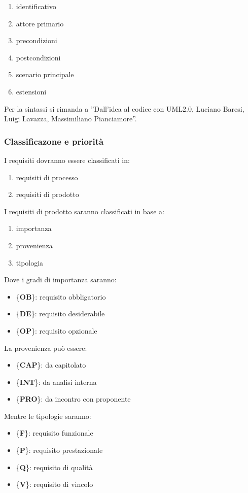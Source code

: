 {{{			\begin{enumerate}
				\item identificativo
				\item attore primario
				\item precondizioni
				\item postcondizioni
				\item scenario principale
				\item estensioni
			\end{enumerate}
			Per la sintassi si rimanda a ”Dall’idea al codice con UML2.0, Luciano Baresi, Luigi Lavazza, Massimiliano Pianciamore”.
			}
			\subsubsection{Classificazone e priorità}{
				I requisiti dovranno essere classificati in:
				\begin{enumerate}
					\item requisiti di processo
					\item requisiti di prodotto
				\end{enumerate}
				I requisiti di prodotto saranno classificati in base a:
				\begin{enumerate}
					\item importanza
					\item provenienza
					\item tipologia
				\end{enumerate}
				Dove i gradi di importanza saranno:
				\begin{itemize}
						\item \{\textbf{OB}\}: requisito obbligatorio
						\item \{\textbf{DE}\}: requisito desiderabile
						\item \{\textbf{OP}\}: requisito opzionale
				\end{itemize}
				La provenienza può essere:
				\begin{itemize}
					\item \{\textbf{CAP}\}: da capitolato
					\item \{\textbf{INT}\}: da analisi interna
					\item \{\textbf{PRO}\}: da incontro con proponente
				\end{itemize}
				Mentre le tipologie saranno:
				\begin{itemize}
					\item \{\textbf{F}\}: requisito funzionale
					\item \{\textbf{P}\}: requisito prestazionale
					\item \{\textbf{Q}\}: requisito di qualità
					\item \{\textbf{V}\}: requisito di vincolo
				\end{itemize}
			}
}}
